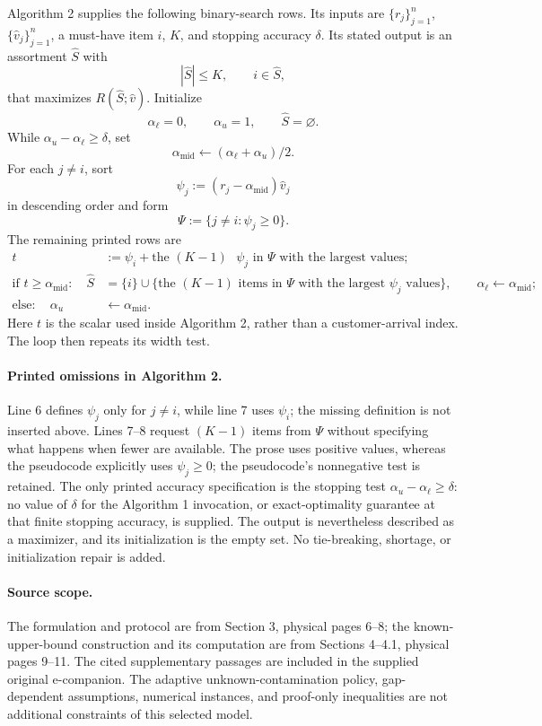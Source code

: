 \documentclass{article}
\begin{document}
Algorithm 2 supplies the following binary-search rows. Its inputs are $\{r_j\}_{j=1}^{n}$, $\{\widehat v_j\}_{j=1}^{n}$, a must-have item $i$, $K$, and stopping accuracy $\delta$. Its stated output is an assortment $\widehat S$ with
\[
|\widehat S|\le K,\qquad i\in\widehat S,
\]
that maximizes $R(\widehat S;\widehat v)$. Initialize
\[
\alpha_\ell=0,\qquad \alpha_u=1,\qquad \widehat S=\varnothing.
\]
While $\alpha_u-\alpha_\ell\ge\delta$, set
\[
\alpha_{\mathrm{mid}}\leftarrow(\alpha_\ell+\alpha_u)/2.
\]
For each $j\ne i$, sort
\[
\psi_j:=(r_j-\alpha_{\mathrm{mid}})\widehat v_j
\]
in descending order and form
\[
\Psi:=\{j\ne i:\psi_j\ge0\}.
\]
The remaining printed rows are
\[
\begin{aligned}
t&:=\psi_i+\text{the $(K-1)$ $\psi_j$ in $\Psi$ with the largest values};\\
\text{if }t\ge\alpha_{\mathrm{mid}}:\quad
\widehat S&=\{i\}\cup
\{\text{the $(K-1)$ items in $\Psi$ with the largest $\psi_j$ values}\},
\qquad \alpha_\ell\leftarrow\alpha_{\mathrm{mid}};\\
\text{else}:\quad \alpha_u&\leftarrow\alpha_{\mathrm{mid}}.
\end{aligned}
\]
Here $t$ is the scalar used inside Algorithm 2, rather than a customer-arrival index. The loop then repeats its width test.

\paragraph{Printed omissions in Algorithm 2.}
Line 6 defines $\psi_j$ only for $j\ne i$, while line 7 uses $\psi_i$; the missing definition is not inserted above. Lines 7--8 request $(K-1)$ items from $\Psi$ without specifying what happens when fewer are available. The prose uses positive values, whereas the pseudocode explicitly uses $\psi_j\ge0$; the pseudocode's nonnegative test is retained. The only printed accuracy specification is the stopping test $\alpha_u-\alpha_\ell\ge\delta$: no value of $\delta$ for the Algorithm 1 invocation, or exact-optimality guarantee at that finite stopping accuracy, is supplied. The output is nevertheless described as a maximizer, and its initialization is the empty set. No tie-breaking, shortage, or initialization repair is added.

\paragraph{Source scope.}
The formulation and protocol are from Section 3, physical pages 6--8; the known-upper-bound construction and its computation are from Sections 4--4.1, physical pages 9--11. The cited supplementary passages are included in the supplied original e-companion. The adaptive unknown-contamination policy, gap-dependent assumptions, numerical instances, and proof-only inequalities are not additional constraints of this selected model.
\end{document}
